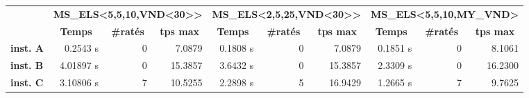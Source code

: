             \begin{table}[H]
                \centering
                \begin{tabular}{l|r|r|r|r|r|r|r|r|r|}
                \cline{2-10}
                                                                       & \multicolumn{3}{c|}{\textbf{MS\_ELS\textless5,5,10,VND\textless30\textgreater\textgreater}}                                           & \multicolumn{3}{c|}{\textbf{MS\_ELS\textless2,5,25,VND\textless30\textgreater\textgreater}}                                           & \multicolumn{3}{c|}{\textbf{MS\_ELS\textless5,5,10,MY\_VND\textgreater}}                                                              \\ \cline{2-10} 
                                                                       & \multicolumn{1}{c|}{\textbf{Temps}} & \multicolumn{1}{c|}{\textbf{\#ratés}} & \multicolumn{1}{c|}{\textbf{tps max}} & \multicolumn{1}{c|}{\textbf{Temps}} & \multicolumn{1}{c|}{\textbf{\#ratés}} & \multicolumn{1}{c|}{\textbf{tps max}} & \multicolumn{1}{c|}{\textbf{Temps}} & \multicolumn{1}{c|}{\textbf{\#ratés}} & \multicolumn{1}{c|}{\textbf{tps max}} \\ \hline
                \multicolumn{1}{|l|}{\textbf{inst. A}} & 0.2543 s                            & 0                                             & 7.0879                                          & 0.1808 s                            & 0                                             & 7.0879                                          & 0.1851 s                            & 0                                             & 8.1061                                          \\ \hline
                \multicolumn{1}{|l|}{\textbf{inst. B}} & 4.01897 s                           & 0                                             & 15.3857                                         & 3.6432 s                            & 0                                             & 15.3857                                         & 2.3309 s                            & 0                                             & 16.2300                                         \\ \hline
                \multicolumn{1}{|l|}{\textbf{inst. C}} & 3.10806 s                           & 7                                             & 10.5255                                         & 2.2898 s                            & 5                                             & 16.9429                                         & 1.2665 s                            & 7                                             & 9.7625                                          \\ \hline

\end{tabular}
\end{table}
